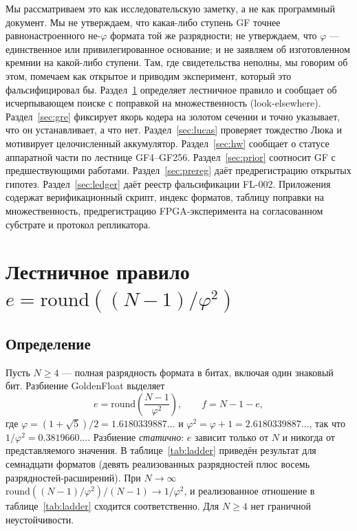 \documentclass[11pt,a4paper]{article}
\theoremstyle{plain}
\begin{document}
Мы рассматриваем это как исследовательскую заметку, а не как программный
документ. Мы не утверждаем, что какая-либо ступень GF точнее равнонастроенного
не-\(\varphi\) формата той же разрядности; не утверждаем, что \(\varphi\) ---
единственное или привилегированное основание; и не заявляем об изготовленном
кремнии на какой-либо ступени. Там, где свидетельства неполны, мы говорим об
этом, помечаем как открытое и приводим эксперимент, который это
фальсифицировал бы. Раздел~\ref{sec:ladder} определяет лестничное правило и
сообщает об исчерпывающем поиске с поправкой на множественность (look-elsewhere).
Раздел~\ref{sec:gre} фиксирует якорь кодера на золотом сечении и точно
указывает, что он устанавливает, а что нет.
Раздел~\ref{sec:lucas} проверяет тождество Люка и мотивирует целочисленный
аккумулятор.
Раздел~\ref{sec:hw} сообщает о статусе аппаратной части по лестнице GF4--GF256.
Раздел~\ref{sec:prior} соотносит GF с предшествующими работами.
Раздел~\ref{sec:prereg} даёт предрегистрацию открытых гипотез.
Раздел~\ref{sec:ledger} даёт реестр фальсификации FL-002.
Приложения содержат верификационный скрипт, индекс форматов, таблицу поправки
на множественность, предрегистрацию FPGA-эксперимента на согласованном
субстрате и протокол репликатора.

\section{Лестничное правило \texorpdfstring{$e = \mathrm{round}((N-1)/\varphi^{2})$}{e = round((N-1)/phi^2)}}\label{sec:ladder}

\subsection{Определение}
Пусть \(N \ge 4\) --- полная разрядность формата в битах, включая один знаковый
бит. Разбиение GoldenFloat выделяет
\begin{equation}
e = \mathrm{round}\!\left(\frac{N-1}{\varphi^{2}}\right), \qquad
f = N - 1 - e,
\label{eq:ladder}
\end{equation}
где \(\varphi = (1+\sqrt{5})/2 = 1.6180339887\ldots\) и
\(\varphi^{2} = \varphi + 1 = 2.6180339887\ldots\),
так что \(1/\varphi^{2} = 0.3819660\ldots\).
Разбиение \emph{статично}: \(e\) зависит только от \(N\) и никогда от
представляемого значения. В таблице~\ref{tab:ladder} приведён результат для
семнадцати форматов (девять реализованных разрядностей плюс восемь
разрядностей-расширений). При \(N \to \infty\)
\(\mathrm{round}((N-1)/\varphi^{2})/(N-1) \to 1/\varphi^{2}\), и реализованное
отношение в таблице~\ref{tab:ladder} сходится соответственно. Для \(N \ge 4\)
нет граничной неустойчивости.
\end{document}
